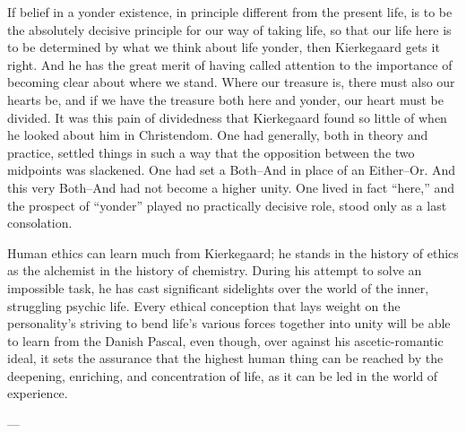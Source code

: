 \documentclass[12pt,a4paper]{book}
\newcommand{\opage}[1]{\marginnote{\footnotesize\textit{[#1]}}}
\begin{document}
If belief in a yonder existence, in principle different from the present life, is to be the
absolutely decisive principle for our way of taking life, so that our life here is to be
determined by what we think about life yonder, then Kierkegaard gets it right. And he has the
great merit of having called attention to the importance of becoming clear about where we stand.
Where our treasure is, there must also our hearts be, and if we have the treasure both here and
yonder, our heart must be divided. It was this pain of dividedness that Kierkegaard found so
little of when he looked about him in Christendom. One had generally, both in theory and practice,
settled things in such a way that the opposition between the two midpoints was slackened. One had
set a Both--And in place of \opage{167}an Either--Or. And this very Both--And had not become a higher unity.
One lived in fact ``here,'' and the prospect of ``yonder'' played no practically decisive role,
stood only as a last consolation.

Human ethics can learn much from Kierkegaard; he stands in the history of ethics as the alchemist
in the history of chemistry. During his attempt to solve an impossible task, he has cast
significant sidelights over the world of the inner, struggling psychic life. Every ethical
conception that lays weight on the personality's striving to bend life's various forces together
into unity will be able to learn from the Danish Pascal, even though, over against his
ascetic-romantic ideal, it sets the assurance that the highest human thing can be reached by the
deepening, enriching, and concentration of life, as it can be led in the world of experience.

\begin{center}---\end{center}
\end{document}
